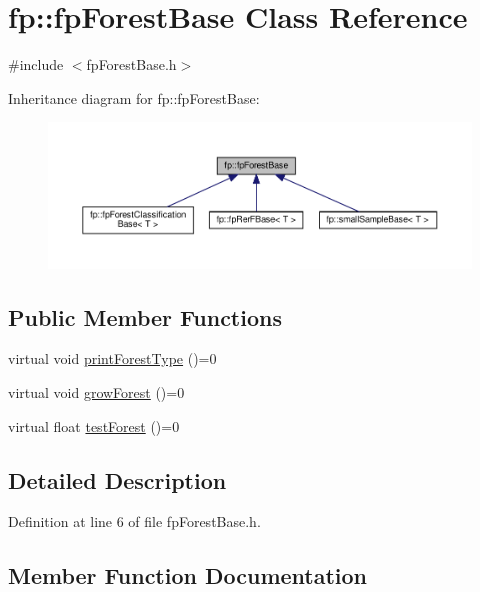 \hypertarget{classfp_1_1fpForestBase}{}\section{fp\+:\+:fp\+Forest\+Base Class Reference}
\label{classfp_1_1fpForestBase}


{\ttfamily \#include $<$fp\+Forest\+Base.\+h$>$}



Inheritance diagram for fp\+:\+:fp\+Forest\+Base\+:
\nopagebreak
\begin{figure}[H]
\begin{center}
\leavevmode
\includegraphics[width=350pt]{classfp_1_1fpForestBase__inherit__graph}
\end{center}
\end{figure}
\subsection*{Public Member Functions}
\begin{DoxyCompactItemize}
\item 
virtual void \hyperlink{classfp_1_1fpForestBase_a5e200f603cca94bb5d9f357489f07e97}{print\+Forest\+Type} ()=0
\item 
virtual void \hyperlink{classfp_1_1fpForestBase_a05b1d924a559536083ee7a8cf3ea542d}{grow\+Forest} ()=0
\item 
virtual float \hyperlink{classfp_1_1fpForestBase_af7becba028a198f650841b718d16ed16}{test\+Forest} ()=0
\end{DoxyCompactItemize}


\subsection{Detailed Description}


Definition at line 6 of file fp\+Forest\+Base.\+h.



\subsection{Member Function Documentation}
\mbox{\label{classfp_1_1fpForestBase_a05b1d924a559536083ee7a8cf3ea542d}} 
